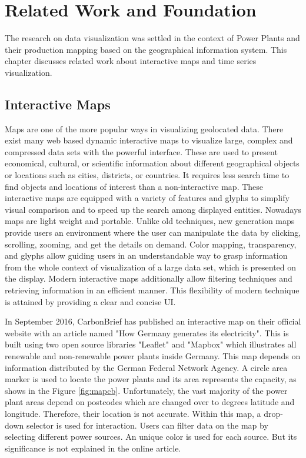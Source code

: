 \chapter{Related Work and Foundation}
\label{chap:relatedWork&Foundation}

The research on data visualization was settled in the context of Power Plants and their production mapping based on the geographical information system.  This chapter discusses related work about interactive maps and time series visualization. 

\section{Interactive Maps}

Maps are one of the more popular ways in visualizing geolocated data. There exist many web based dynamic interactive maps to visualize large, complex and compressed data sets with the powerful interface. These are used to present economical, cultural, or scientific information about different geographical objects or locations such as cities, districts, or countries. It requires less search time to find objects and locations of interest than a non-interactive map. These interactive maps are equipped with a variety of features and glyphs to simplify visual comparison and to speed up the search among displayed entities. Nowadays maps are light weight and portable. Unlike old techniques, new generation maps provide users an environment where the user can manipulate the data by clicking, scrolling, zooming, and get the details on demand. Color mapping, transparency, and glyphs allow guiding users in an understandable way to grasp information from the whole context of visualization of a large data set, which is presented on the display. Modern interactive maps additionally allow filtering techniques and retrieving information in an efficient manner. This flexibility of modern technique is attained by providing a clear and concise UI.

In September 2016, CarbonBrief \cite{cbg2016} has published an interactive map on their official website with an article named "How Germany generates its electricity". This is built using two open source libraries "Leaflet" and "Mapbox" which illustrates all renewable and non-renewable power plants inside Germany. This map depends on information distributed by the German Federal Network Agency. A circle area marker is used to locate the power plants and its area represents the capacity, as shows in the Figure \ref{fig:mapcb}. Unfortunately, the vast majority of the power plant areas depend on postcodes which are changed over to degrees latitude and longitude. Therefore, their location is not accurate. Within this map, a drop-down selector is used for interaction. Users can filter data on the map by selecting different power sources. An unique color is used for each source. But its significance is not explained in the online article.

